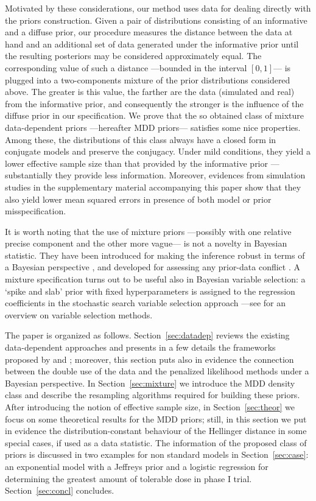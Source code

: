 \documentclass{statsoc}
\begin{document}
Motivated by these considerations, our method uses data for dealing directly with the priors construction. Given a pair of distributions consisting of an informative and a diffuse prior, our procedure measures the distance between the data at 
hand and an additional set of data generated under the informative prior until the resulting posteriors may be considered approximately equal. The corresponding value of such a distance ---bounded in the interval $[0,1]$--- is plugged into a two-components mixture of the prior distributions considered above. The greater is this value, the farther are the data (simulated and real) from the informative prior, 
and consequently the stronger is the influence of the diffuse 
prior in our specification.
We prove that the so obtained class of mixture data-dependent priors ---hereafter MDD priors--- satisfies some nice properties. Among these, the distributions of this class always have a closed form in conjugate models and preserve the conjugacy. Under mild  conditions, they yield a lower effective sample size than that provided by the informative prior ---substantially they provide less information. Moreover, evidences from simulation studies in the supplementary material accompanying this paper show that they also yield lower mean squared errors in presence of both model or prior misspecification.

It is worth noting that the use of mixture priors ---possibly with one relative precise component and the other more vague--- is not a novelty in Bayesian statistic. They have been introduced for making the inference robust in terms of a Bayesian perspective \citep{berger1986robust}, and developed for assessing any prior-data conflict \citep{schmidli2014robust,mutsvari2016addressing}. A mixture specification turns out to be useful also in Bayesian variable selection: a `spike and slab' prior \citep{miller2002subset} with fixed hyperparameters is assigned to the regression coefficients in the stochastic search variable selection approach ---see \cite{o2009review} for an overview on variable selection methods. 

The paper is organized as follows. Section~\ref{sec:datadep} reviews the existing data-dependent approaches and presents in a few details the frameworks proposed by  \cite{darnieder2011bayesian} and \cite{gelmandatadependent}; moreover, this section puts also in evidence the connection between the double use of the data and the penalized likelihood methods under a Bayesian perspective. In Section~\ref{sec:mixture} we introduce the MDD density class and describe the resampling algorithms required for building these priors. After introducing the notion of effective sample size, in Section~\ref{sec:theor} we focus on some theoretical results for the MDD priors; still, in this section we put in evidence the distribution-constant behaviour of the Hellinger distance in some special cases, if used as a data statistic. The information of the proposed class of priors is discussed in two examples for non standard models in Section~\ref{sec:case}: an exponential model with a Jeffreys prior and a logistic regression for determining the greatest amount of tolerable dose in phase I trial. Section~\ref{sec:concl} concludes.
\end{document}
